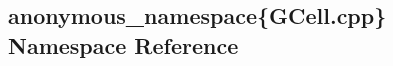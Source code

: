 \hypertarget{namespaceanonymous__namespace_02GCell_8cpp_03}{}\subsection{anonymous\+\_\+namespace\{G\+Cell.\+cpp\} Namespace Reference}
\label{namespaceanonymous__namespace_02GCell_8cpp_03}
